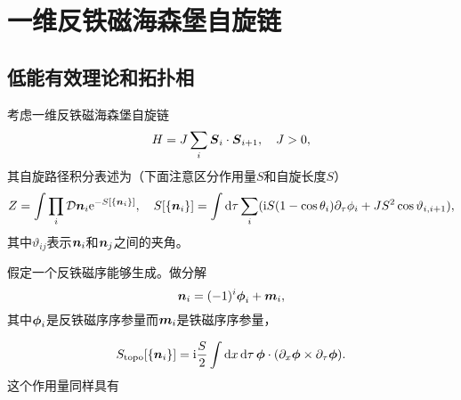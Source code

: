 \section{一维反铁磁海森堡自旋链}

\subsection{低能有效理论和拓扑相}

考虑一维反铁磁海森堡自旋链
\begin{equation}
    H = J \sum_{i} \vb*{S}_i \cdot \vb*{S}_{i+1}, \quad J > 0,
\end{equation}
其自旋路径积分表述为（下面注意区分作用量$S$和自旋长度$S$）
\begin{equation}
    Z = \int \prod_i \mathcal{D} \vb*{n}_i \mathrm{e}^{-S[\{\vb*{n}_i\}]} , \quad S[\{\vb*{n}_i\}] = \int \dd{\tau} \sum_i ( \mathrm{i} S (1 - \cos \theta_i) \partial_\tau \phi_i + J S^2 \cos \vartheta_{i, i+1} ),
\end{equation}
其中$\vartheta_{ij}$表示$\vb*{n}_i$和$\vb*{n}_j$之间的夹角。

假定一个反铁磁序能够生成。做分解
\begin{equation}
    \vb*{n}_i = (-1)^i \vb*{\phi}_i + \vb*{m}_i,
\end{equation}
其中$\vb*{\phi}_i$是反铁磁序序参量而$\vb*{m}_i$是铁磁序序参量，

\begin{equation}
    S_\text{topo}[\{\vb*{n}_i\}] = \mathrm{i} \frac{S}{2} \int \dd{x} \dd{\tau} \vb*{\phi} \cdot (\partial_x \vb*{\phi} \times \partial_\tau \vb*{\phi}).
\end{equation}
这个作用量同样具有
